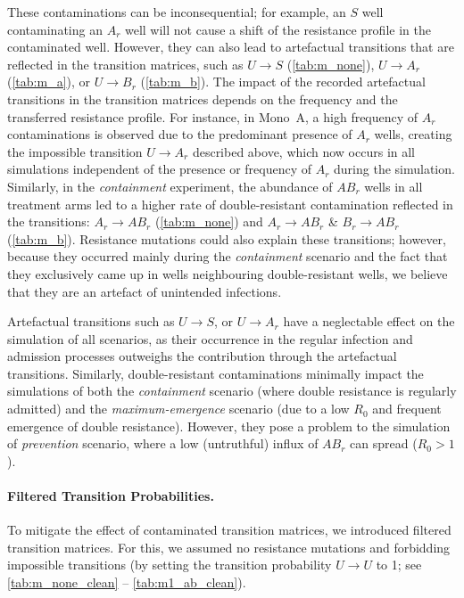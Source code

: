 These contaminations can be inconsequential; for example, an \( S \) well contaminating an \( A_r \) well will not cause a shift of the resistance profile in the contaminated well.
However, they can also lead to artefactual transitions that are reflected in the transition matrices,  such as \( U \rightarrow S \) (\autoref{tab:m_none}), \( U \rightarrow A_r \) (\autoref{tab:m_a}), or \( U \rightarrow B_r \) (\autoref{tab:m_b}).
The impact of the recorded artefactual transitions in the transition matrices depends on the frequency and the transferred resistance profile.
For instance, in Mono~A, a high frequency of \( A_r \) contaminations is observed due to the predominant presence of \( A_r \) wells, creating the impossible transition \( U \rightarrow A_r \) described above, which now occurs in all simulations independent of the presence or frequency of \(A_r\) during the simulation. 
Similarly, in the \textit{containment} experiment, the abundance of \( AB_r\) wells in all treatment arms led to a higher rate of double-resistant contamination reflected in the transitions: \( A_r \rightarrow AB_r \) (\autoref{tab:m_none}) and \(A_r \rightarrow AB_r \) \& \(B_r \rightarrow AB_r \)  (\autoref{tab:m_b}). 
Resistance mutations could also explain these transitions; however, because they occurred mainly during the \textit{containment} scenario and the fact that they exclusively came up in wells neighbouring double-resistant wells, we believe that they are an artefact of unintended infections. 

Artefactual transitions such as \( U  \rightarrow S \), or \(U \rightarrow A_r \) 
have a neglectable effect on the simulation of all scenarios, as their occurrence in the regular infection and admission processes outweighs the contribution through the artefactual transitions.
Similarly, double-resistant contaminations minimally impact the simulations of both the \textit{containment} scenario (where double resistance is regularly admitted) and the \textit{maximum-emergence} scenario (due to a low \( R_0 \) and frequent emergence of double resistance).
However, they pose a problem to the simulation of \textit{prevention} scenario, where a low (untruthful) influx of $AB_r$ can spread ($R_0 > 1$).

\paragraph{Filtered Transition Probabilities.}
To mitigate the effect of contaminated transition matrices, we introduced filtered transition matrices. 
For this, we assumed no resistance mutations and forbidding impossible transitions (by setting the transition probability \( U \rightarrow U \) to 1; see \autoref{tab:m_none_clean} -- \ref{tab:m1_ab_clean}). 

